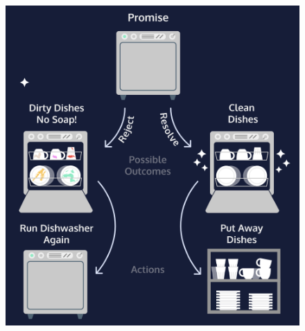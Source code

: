 \documentclass[11pt]{article}
\begin{document}
\begin{figure}[H]
\includegraphics[scale = 0.27]{15_1}
\centering
\end{figure}
\end{document}
